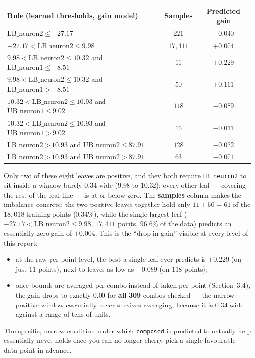 \documentclass[11pt,a4paper]{article}
\begin{document}
\begin{center}
\begin{tabular}{lcc}
\toprule
\textbf{Rule (learned thresholds, gain model)} & \textbf{Samples} & \textbf{Predicted gain} \\
\midrule
$\text{LB\_neuron2} \le -27.17$ & $221$ & $-0.040$ \\
$-27.17 < \text{LB\_neuron2} \le 9.98$ & $17{,}411$ & $+0.004$ \\
$9.98 < \text{LB\_neuron2} \le 10.32$ \;and\; $\text{LB\_neuron1} \le -8.51$ & $11$ & $+0.229$ \\
$9.98 < \text{LB\_neuron2} \le 10.32$ \;and\; $\text{LB\_neuron1} > -8.51$ & $50$ & $+0.161$ \\
$10.32 < \text{LB\_neuron2} \le 10.93$ \;and\; $\text{UB\_neuron1} \le 9.02$ & $118$ & $-0.089$ \\
$10.32 < \text{LB\_neuron2} \le 10.93$ \;and\; $\text{UB\_neuron1} > 9.02$ & $16$ & $-0.011$ \\
$\text{LB\_neuron2} > 10.93$ \;and\; $\text{UB\_neuron2} \le 87.91$ & $128$ & $-0.032$ \\
$\text{LB\_neuron2} > 10.93$ \;and\; $\text{UB\_neuron2} > 87.91$ & $63$ & $-0.001$ \\
\bottomrule
\end{tabular}
\end{center}

Only two of these eight leaves are positive, and they both require \texttt{LB\_neuron2} to sit inside a window barely $0.34$ wide ($9.98$ to $10.32$); every other leaf --- covering the rest of the real line --- is at or below zero. The \textbf{samples} column makes the imbalance concrete: the two positive leaves together hold only $11+50=61$ of the $18{,}018$ training points ($0.34\%$), while the single largest leaf ($-27.17 < \text{LB\_neuron2}\le 9.98$, $17{,}411$ points, $96.6\%$ of the data) predicts an essentially-zero gain of $+0.004$. This is the ``drop in gain'' visible at every level of this report:
\begin{itemize}
  \item at the raw per-point level, the best a single leaf ever predicts is $+0.229$ (on just $11$ points), next to leaves as low as $-0.089$ (on $118$ points);
  \item once bounds are averaged per combo instead of taken per point (Section~3.4), the gain drops to exactly $0.00$ for \textbf{all 309} combos checked --- the narrow positive window essentially never survives averaging, because it is $0.34$ wide against a range of tens of units.
\end{itemize}
The specific, narrow condition under which \texttt{composed} is predicted to actually help essentially never holds once you can no longer cherry-pick a single favourable data point in advance.
\end{document}
